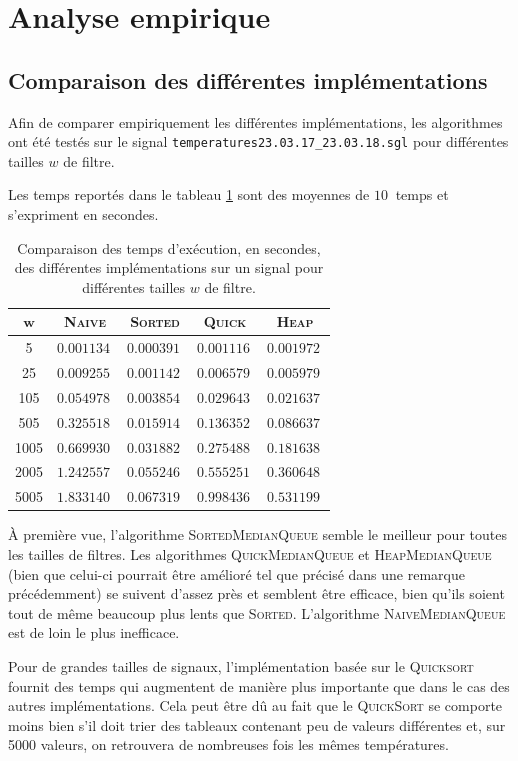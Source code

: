 \documentclass[a4paper, 12pt]{article}
\begin{document}
	\section{Analyse empirique}
	\subsection{Comparaison des différentes implémentations}
	Afin de comparer empiriquement les différentes implémentations, les algorithmes ont été testés sur le signal \texttt{temperatures23.03.17\_23.03.18.sgl} pour différentes tailles \(w\) de filtre.\par
	Les temps reportés dans le tableau \ref{tab:tab_comp_empir} sont des moyennes de \(\SI{10}{}\) temps et s'expriment en secondes.\par
	\begin{table}[!ht]
	    \centering
	    \begin{tabular}{|c|c|c|c|c|}
	        \hline
	        \(\bm{w}\) & \textsc{Naive} & \textsc{Sorted} & \textsc{Quick} & \textsc{Heap}\\
	        \hline
	        \hline
	        5 & \(\SI{0.001134}{}\) & \(\SI{0.000391}{}\) & \(\SI{0.001116}{}\) & \(\SI{0.001972}{}\)\\
	        25 & \(\SI{0.009255}{}\) & \(\SI{0.001142}{}\) & \(\SI{0.006579}{}\) & \(\SI{0.005979}{}\)\\
	        105 & \(\SI{0.054978}{}\) & \(\SI{0.003854}{}\) & \(\SI{0.029643}{}\) & \(\SI{0.021637}{}\)\\
	        505 & \(\SI{0.325518}{}\) & \(\SI{0.015914}{}\) & \(\SI{0.136352}{}\) & \(\SI{0.086637}{}\)\\
	        1005 & \(\SI{0.669930}{}\) & \(\SI{0.031882}{}\) & \(\SI{0.275488}{}\) & \(\SI{0.181638}{}\)\\
	        2005 & \(\SI{1.242557}{}\) & \(\SI{0.055246}{}\) & \(\SI{0.555251}{}\) & \(\SI{0.360648}{}\)\\
	        5005 & \(\SI{1.833140}{}\) & \(\SI{0.067319}{}\) & \(\SI{0.998436}{}\) & \(\SI{0.531199}{}\)\\
	        \hline
	    \end{tabular}
	    \caption{Comparaison des temps d'exécution, en secondes, des différentes implémentations sur un signal pour différentes tailles \(w\) de filtre.}
	    \label{tab:tab_comp_empir}
	\end{table}
	À première vue, l'algorithme \textsc{SortedMedianQueue} semble le meilleur pour toutes les tailles de filtres. Les algorithmes \textsc{QuickMedianQueue} et \textsc{HeapMedianQueue} (bien que celui-ci pourrait être amélioré tel que précisé dans une remarque précédemment) se suivent d'assez près et semblent être efficace, bien qu'ils soient tout de même beaucoup plus lents que \textsc{Sorted}. L'algorithme \textsc{NaiveMedianQueue} est de loin le plus inefficace.\par 
	Pour de grandes tailles de signaux, l'implémentation basée sur le \textsc{Quicksort} fournit des temps qui augmentent de manière plus importante que dans le cas des autres implémentations. Cela peut être dû au fait que le \textsc{QuickSort} se comporte moins bien s'il doit trier des tableaux contenant peu de valeurs différentes et, sur 5000 valeurs, on retrouvera de nombreuses fois les mêmes températures.
\end{document}
